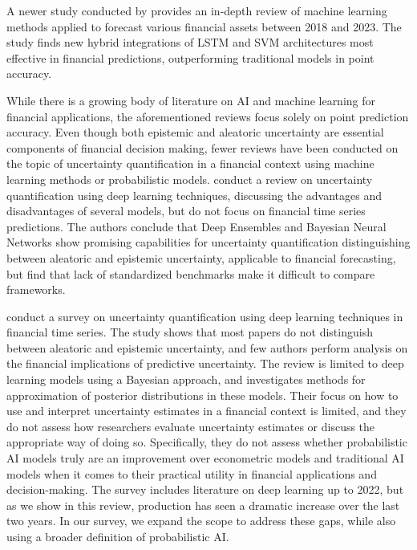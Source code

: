 A newer study conducted by \textcite{Khattak2023SurveyAIModels} provides an in-depth review of machine learning methods applied to forecast various financial assets between 2018 and 2023. The study finds new hybrid integrations of LSTM and SVM architectures most effective in financial predictions, outperforming traditional models in point accuracy.

While there is a growing body of literature on AI and machine learning for financial applications, the aforementioned reviews focus solely on point prediction accuracy. Even though both epistemic and aleatoric uncertainty are essential components of financial decision making, fewer reviews have been conducted on the topic of uncertainty quantification in a financial context using machine learning methods or probabilistic models. \textcite{abdar2021ReviewUQ} conduct a review on uncertainty quantification using deep learning techniques, discussing the advantages and disadvantages of several models, but do not focus on financial time series predictions. The authors conclude that Deep Ensembles and Bayesian Neural Networks show promising capabilities for uncertainty quantification distinguishing between aleatoric and epistemic uncertainty, applicable to financial forecasting, but find that lack of standardized benchmarks make it difficult to compare frameworks.

\textcite{Blasco_et_al_2024} conduct a survey on uncertainty quantification using deep learning techniques in financial time series. The study shows that most papers do not distinguish between aleatoric and epistemic uncertainty, and few authors perform analysis on the financial implications of predictive uncertainty. The review is limited to deep learning models using a Bayesian approach, and investigates methods for approximation of posterior distributions in these models. Their focus on how to use and interpret uncertainty estimates in a financial context is limited, and they do not assess how researchers evaluate uncertainty estimates or discuss the appropriate way of doing so. Specifically, they do not assess whether probabilistic AI models truly are an improvement over econometric models and traditional AI models when it comes to their practical utility in financial applications and decision-making. The survey includes literature on deep learning up to 2022, but as we show in this review, production has seen a dramatic increase over the last two years. In our survey, we expand the scope to address these gaps, while also using a broader definition of probabilistic AI.

